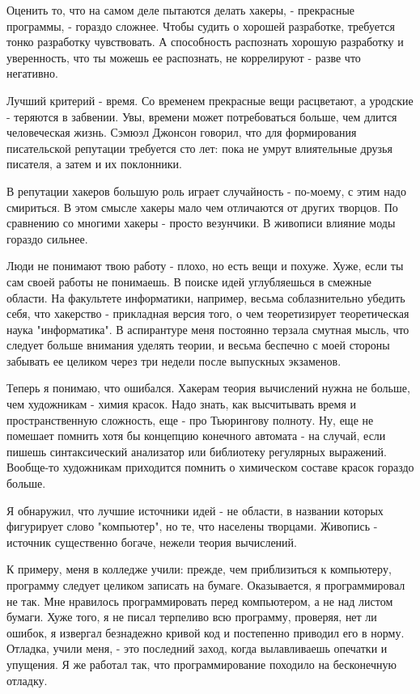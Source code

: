 \documentclass[ebook,12pt,oneside,openany]{memoir}
\begin{document}
Оценить то, что на самом деле пытаются делать хакеры, - прекрасные
программы, - гораздо сложнее. Чтобы судить о хорошей разработке,
требуется тонко разработку чувствовать. А способность распознать
хорошую разработку и уверенность, что ты можешь ее распознать, не
коррелируют - разве что негативно.

Лучший критерий - время. Со временем прекрасные вещи расцветают, а
уродские - теряются в забвении. Увы, времени может потребоваться
больше, чем длится человеческая жизнь. Сэмюэл Джонсон говорил, что для
формирования писательской репутации требуется сто лет: пока не умрут
влиятельные друзья писателя, а затем и их поклонники.

В репутации хакеров большую роль играет случайность - по-моему, с этим
надо смириться. В этом смысле хакеры мало чем отличаются от других
творцов. По сравнению со многими хакеры - просто везунчики. В живописи
влияние моды гораздо сильнее.

Люди не понимают твою работу - плохо, но есть вещи и похуже. Хуже,
если ты сам своей работы не понимаешь. В поиске идей углубляешься в
смежные области. На факультете информатики, например, весьма
соблазнительно убедить себя, что хакерство - прикладная версия того, о
чем теоретизирует теоретическая наука "информатика". В аспирантуре
меня постоянно терзала смутная мысль, что следует больше внимания
уделять теории, и весьма беспечно с моей стороны забывать ее целиком
через три недели после выпускных экзаменов.

Теперь я понимаю, что ошибался. Хакерам теория вычислений нужна не
больше, чем художникам - химия красок. Надо знать, как высчитывать
время и пространственную сложность, еще - про Тьюрингову полноту. Ну,
еще не помешает помнить хотя бы концепцию конечного автомата - на
случай, если пишешь синтаксический анализатор или библиотеку
регулярных выражений. Вообще-то художникам приходится помнить о
химическом составе красок гораздо больше.

Я обнаружил, что лучшие источники идей - не области, в названии
которых фигурирует слово "компьютер", но те, что населены творцами.
Живопись - источник существенно богаче, нежели теория вычислений.

К примеру, меня в колледже учили: прежде, чем приблизиться к
компьютеру, программу следует целиком записать на бумаге. Оказывается,
я программировал не так. Мне нравилось программировать перед
компьютером, а не над листом бумаги. Хуже того, я не писал терпеливо
всю программу, проверяя, нет ли ошибок, я извергал безнадежно кривой
код и постепенно приводил его в норму. Отладка, учили меня, - это
последний заход, когда вылавливаешь опечатки и упущения. Я же работал
так, что программирование походило на бесконечную отладку.
\end{document}
